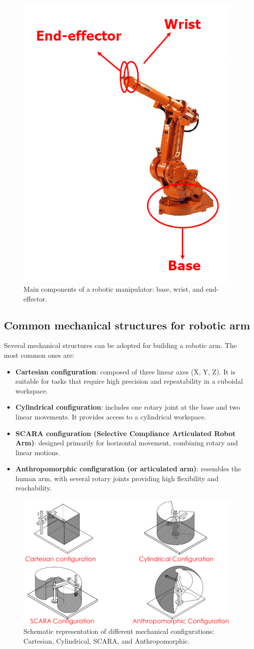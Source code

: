 \begin{figure}[H]
  \centering
  \includegraphics[width=0.35\linewidth]{imgs/manipulator_labeled.png}
  \caption{Main components of a robotic manipulator: base, wrist, and end-effector.}
\end{figure}

\subsection{Common mechanical structures for robotic arm}

Several mechanical structures can be adopted for building a robotic arm. The most common ones are:

\begin{itemize}
  \item \textbf{Cartesian configuration}: composed of three linear axes (X, Y, Z). It is suitable for tasks that require high precision and repeatability in a cuboidal workspace.
  \item \textbf{Cylindrical configuration}: includes one rotary joint at the base and two linear movements. It provides access to a cylindrical workspace.
  \item \textbf{SCARA configuration (Selective Compliance Articulated Robot Arm)}: designed primarily for horizontal movement, combining rotary and linear motions.
  \item \textbf{Anthropomorphic configuration (or articulated arm)}: resembles the human arm, with several rotary joints providing high flexibility and reachability.
\end{itemize}

\begin{figure}[H]
  \centering
  \includegraphics[width=0.8\linewidth]{imgs/mechanical_structures_schematic.png}
  \caption{Schematic representation of different mechanical configurations: Cartesian, Cylindrical, SCARA, and Anthropomorphic.}
\end{figure}

